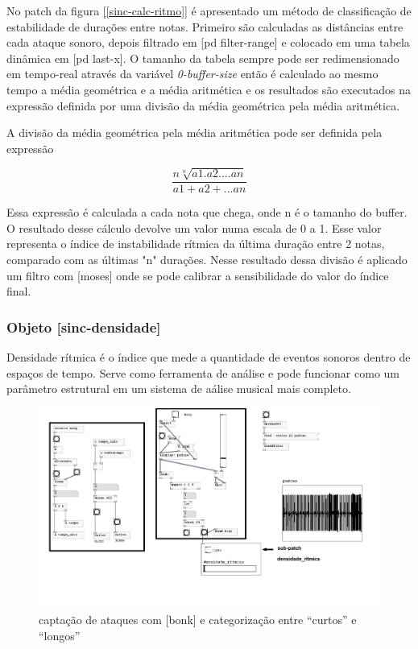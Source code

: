 \documentclass{ppgmus}
\begin{document}
No patch da figura \ref{[sinc-calc-ritmo]} é apresentado um método de classificação de estabilidade
de durações entre notas. Primeiro são calculadas as distâncias entre cada ataque
sonoro, depois filtrado em [pd filter-range] e colocado em uma tabela dinâmica em
[pd last-x]. O tamanho da tabela sempre pode ser redimensionado em tempo-real através
da variável \textit{0-buffer-size} então é calculado ao mesmo tempo a média geométrica
e a média aritmética e os resultados são executados na expressão definida por uma
divisão da média geométrica pela média aritmética. %


A divisão da média geométrica pela média aritmética pode ser definida pela expressão

\begin{equation}
\frac{n\sqrt[n]{a1.a2....an}}{a1+a2+...an} 
\end{equation}  

Essa expressão é calculada a cada nota que chega, onde n é o tamanho do buffer.
O resultado desse cálculo devolve um valor numa escala de 0 a 1.
Esse valor representa o índice de instabilidade rítmica da última duração entre 2 notas,
comparado com as últimas "n" durações.
Nesse resultado dessa divisão é aplicado um filtro com [moses] onde se pode calibrar
a sensibilidade do valor do índice final.


\subsubsection{Objeto [sinc-densidade]}



Densidade rítmica é o índice que mede a quantidade de eventos sonoros
dentro de espaços de tempo. Serve como ferramenta de análise e pode funcionar
como um parâmetro estrutural em um sistema de aálise musical mais completo.


\begin{figure}
\includegraphics[scale=.5]{prot5b}
\caption{captação de ataques com [bonk\texttildelow] e categorização entre ``curtos'' e ``longos''}
\label{prot5b}
\end{figure}
\end{document}

